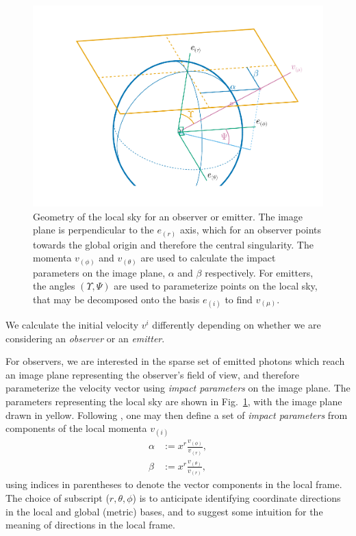 \documentclass[fleqn,usenatbib]{mnras}
\begin{document}
\begin{figure}
    \centering
    \includegraphics[width=0.99\linewidth]{figures/skycoords.pdf}
    \caption{
    Geometry of the local sky for an observer or emitter. The image plane is
    perpendicular to the $e_{(r)}$ axis, which for an observer points towards
    the global origin and therefore the central singularity. The momenta
    $v_{(\phi)}$ and $v_{(\theta)}$ are used to calculate the impact parameters
    on the image plane, $\alpha$ and $\beta$ respectively. For emitters, the
    angles $(\Upsilon, \Psi)$ are used to parameterize points on the local sky,
    that may be decomposed onto the basis $e_{(i)}$ to find $v_{(\mu)}$.
    }
    \label{fig:observer-coordinates}
\end{figure}

We calculate the initial velocity $v^i$ differently depending on whether we are
considering an \emph{observer} or an \emph{emitter}.

For observers, we are interested in the sparse set of emitted photons which
reach an image plane representing the observer's field of view, and therefore
parameterize the velocity vector using \emph{impact parameters} on the image
plane. The parameters representing the local sky are shown in
Fig.~\ref{fig:observer-coordinates}, with the image plane drawn in yellow.
Following \cite{cunningham_optical_1973}, one may then define a set of
\emph{impact
parameters} from components of the local momenta $v_{(i)}$
\begin{align}
    \alpha &:=  x^r \frac{v_{(\phi)}}{v_{(r)}}, \\
    \beta &:= x^r \frac{v_{(\theta)}}{v_{(r)}},
\end{align}
using indices in parentheses to denote the vector components in the local
frame. The choice of subscript ($r, \theta, \phi$) is to anticipate identifying
coordinate directions in the local and global (metric) bases, and to suggest
some intuition for the meaning of directions in the local frame.
\end{document}
